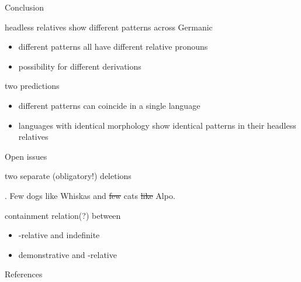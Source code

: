 \documentclass[12pt]{beamer}
\begin{document}
\begin{frame}{Conclusion}

headless relatives show different patterns across Germanic
\pause

\begin{itemize}
  \item different patterns all have different relative pronouns\pause
  \item possibility for different derivations
\end{itemize}

\pause

two predictions\pause

\begin{itemize}
  \item different patterns can coincide in a single language\pause
  \item languages with identical morphology show identical patterns in their headless relatives
\end{itemize}


\end{frame}


\begin{frame}{Open issues}

\pause

two separate (obligatory!) deletions \pause

\ex. Few dogs like Whiskas and \sout{few} cats \sout{like} Alpo.

\pause


containment relation(?) between

\begin{itemize}
  \item {}-relative and indefinite
  \item demonstrative and -relative
\end{itemize}



\end{frame}

\appendix

\begin{frame}[allowframebreaks]{References}

  \newrefcontext[sorting=nyt]
	\printbibliography

\end{frame}
\end{document}
